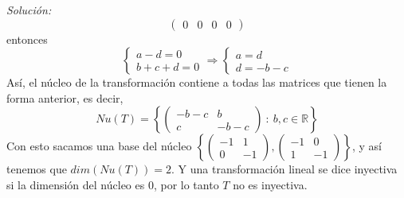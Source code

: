 \documentclass{article}
\newenvironment{solution}
    {\textit{Solución:}}
    {}
\begin{document}
\begin{solution}
\[\begin{pmatrix}
0 & 0 & 0 & 0
\end{pmatrix}
\]
entonces
\[
\begin{cases}
a - d = 0 \\
b + c + d = 0
\end{cases} \Rightarrow
\begin{cases}
a = d \\
d = -b-c
\end{cases}
\]
Así, el núcleo de la transformación contiene a todas las matrices que tienen la forma anterior, es decir,
\[
Nu(T) = \left\{ \begin{pmatrix} -b-c & b \\ c & -b-c \end{pmatrix} \ : \ b,c\in \mathbb{R} \right \}
\]
Con esto sacamos una base del núcleo $\left \{ \begin{pmatrix} -1 & 1 \\ 0 & -1 \end{pmatrix}, \begin{pmatrix} -1 & 0 \\ 1 & -1 \end{pmatrix} \right \}$, y así tenemos que $dim(Nu(T))=2$. Y una transformación lineal se dice inyectiva si la dimensión del núcleo es $0$, por lo tanto $T$ no es inyectiva.


\end{solution}
\end{document}
